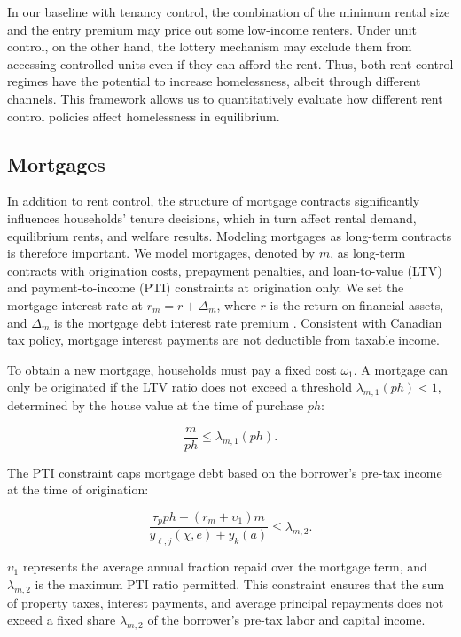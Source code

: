 \documentclass[parskip=full]{article}
\begin{document}
In our baseline with tenancy control, the combination of the minimum rental size and the entry premium may price out some low-income renters. Under unit control, on the other hand, the lottery mechanism may exclude them from accessing controlled units even if they can afford the rent. Thus, both rent control regimes have the potential to increase homelessness, albeit through different channels. This framework allows us to quantitatively evaluate how different rent control policies affect homelessness in equilibrium.

\subsection{Mortgages}\label{subsection:morgtages}

In addition to rent control, the structure of mortgage contracts significantly influences households' tenure decisions, which in turn affect rental demand, equilibrium rents, and welfare results. Modeling mortgages as long-term contracts is therefore important. We model mortgages, denoted by $m$, as long-term contracts with origination costs, prepayment penalties, and loan-to-value (LTV) and payment-to-income (PTI) constraints at origination only. We set the mortgage interest rate at $r_{m}=r+\Delta_m$, where $r$ is the return on financial assets, and $\Delta_m$ is the mortgage debt interest rate premium \citep{sommeretal-2013,sommersullivan-2017,kaplanetal-2019}. Consistent with Canadian tax policy, mortgage interest payments are not deductible from taxable income.

To obtain a new mortgage, households must pay a fixed cost $\omega_{1}$. A mortgage can only be originated if the LTV ratio does not exceed a threshold $\lambda_{m,1}(ph)<1$, determined by the house value at the time of purchase $ph$:

\begin{equation}\label{eq:LTV}
\frac{m}{p h} \leq \lambda_{m,1}(ph).
\end{equation}

\noindent The PTI constraint caps mortgage debt based on the borrower's pre-tax income at the time of origination: 

\begin{equation}\label{eq:PTI}
\frac{\tau_{p}ph+(r_{m}+\upsilon_{1})m}{y_{\ell,j}(\chi,e)+y_{k}(a)} \leq \lambda_{m,2}.
\end{equation}

\noindent $\upsilon_{1}$ represents the average annual fraction repaid over the mortgage term, and $\lambda_{m,2}$ is the maximum PTI ratio permitted. This constraint ensures that the sum of property taxes, interest payments, and average principal repayments does not exceed a fixed share $\lambda_{m,2}$ of the borrower's pre-tax labor and capital income.
\end{document}
